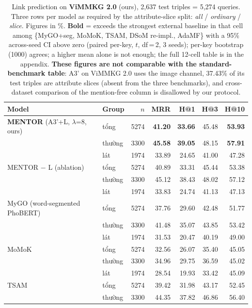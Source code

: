 \begin{table}[t]
\centering
\footnotesize
\caption{Link prediction on \textbf{ViMMKG 2.0} (ours), 2{,}637 test triples = 5{,}274 queries. Three rows per model as required by the attribute-slice split: \emph{all} / \emph{ordinary} / \emph{slice}. Figures in \%. \textbf{Bold} = exceeds the strongest external baseline in that cell among \{MyGO+seg, MoMoK, TSAM, DSoM re-impl., AdaMF\} with a 95\% across-seed CI above zero (paired per-key, $t$, df\,=\,2, 3 seeds); per-key bootstrap (1000) agrees; a higher mean alone is not enough; the full 12-cell table is in the appendix. \textbf{These figures are not comparable with the standard-benchmark table}: A3' on ViMMKG 2.0 uses the image channel, 37.43\% of its test triples are attribute slices (absent from the three benchmarks), and cross-dataset comparison of the mention-free column is disallowed by our protocol.}
\label{tab:vimmkg2}
\begin{tabular}{l l r r r r r}
\toprule
Model & Group & $n$ & MRR & H@1 & H@3 & H@10 \\
\midrule
\textbf{MENTOR} (A3'+L, $\lambda$=8, ours) & tổng & 5274 & \textbf{41.20} & \textbf{33.66} & 45.48 & \textbf{53.93} \\
 & thường & 3300 & \textbf{45.58} & \textbf{39.05} & 48.15 & \textbf{57.91} \\
 & lát & 1974 & 33.89 & 24.65 & 41.00 & 47.28 \\
\midrule
MENTOR $-$ L (ablation) & tổng & 5274 & 40.89 & 33.31 & 45.44 & 53.38 \\
 & thường & 3300 & 45.12 & 38.43 & 48.02 & 57.12 \\
 & lát & 1974 & 33.83 & 24.74 & 41.13 & 47.13 \\
\midrule
MyGO (word-segmented PhoBERT) & tổng & 5274 & 37.76 & 29.60 & 42.48 & 51.77 \\
 & thường & 3300 & 41.48 & 35.07 & 43.85 & 53.42 \\
 & lát & 1974 & 31.53 & 20.47 & 40.19 & 49.00 \\
\midrule
MoMoK & tổng & 5274 & 32.56 & 26.07 & 35.40 & 45.05 \\
 & thường & 3300 & 34.96 & 29.75 & 36.59 & 45.02 \\
 & lát & 1974 & 28.54 & 19.93 & 33.42 & 45.09 \\
\midrule
TSAM & tổng & 5274 & 39.42 & 31.98 & 43.17 & 52.45 \\
 & thường & 3300 & 44.35 & 37.82 & 46.86 & 56.40 \\

\end{tabular}
\end{table}
